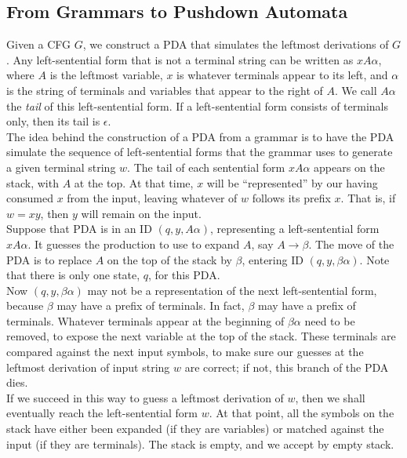 \documentclass[]{article}
\begin{document}
  \subsection*{From Grammars to Pushdown Automata}
    Given a CFG $G$, we construct a PDA that simulates the leftmost derivations
    of $G$. Any left-sentential form that is not a terminal string can be
    written as $xA\alpha$, where $A$ is the leftmost variable, $x$ is whatever
    terminals appear to its left, and $\alpha$ is the string of terminals and
    variables that appear to the right of $A$. We call $A\alpha$ the \emph{tail}
    of this left-sentential form. If a left-sentential form consists of
    terminals only, then its tail is $\epsilon$. \\
    \indent The idea behind the construction of a PDA from a grammar is to have
    the PDA simulate the sequence of left-sentential forms that the grammar uses
    to generate a given terminal string $w$. The tail of each sentential form
    $xA\alpha$ appears on the stack, with $A$ at the top. At that time, $x$ will
    be ``represented'' by our having consumed $x$ from the input, leaving
    whatever of $w$ follows its prefix $x$. That is, if $w = xy$, then $y$ will
    remain on the input. \\
    \indent Suppose that PDA is in an ID $(q,y,A\alpha)$, representing a
    left-sentential form $xA\alpha$. It guesses the production to use to expand
    $A$, say $A \rightarrow \beta$. The move of the PDA is to replace $A$ on the
    top of the stack by $\beta$, entering ID $(q,y,\beta\alpha)$. Note that
    there is only one state, $q$, for this PDA. \\
    \indent Now $(q,y,\beta\alpha)$ may not be a representation of the next
    left-sentential form, because $\beta$ may have a prefix of terminals. In
    fact, $\beta$ may have a prefix of terminals. Whatever terminals appear at
    the beginning of $\beta\alpha$ need to be removed, to expose the next
    variable at the top of the stack. These terminals are compared against the
    next input symbols, to make sure our guesses at the leftmost derivation of
    input string $w$ are correct; if not, this branch of the PDA dies. \\
    \indent If we succeed in this way to guess a leftmost derivation of $w$,
    then we shall eventually reach the left-sentential form $w$. At that point,
    all the symbols on the stack have either been expanded (if they are
    variables) or matched against the input (if they are terminals). The stack
    is empty, and we accept by empty stack. \\
\end{document}
